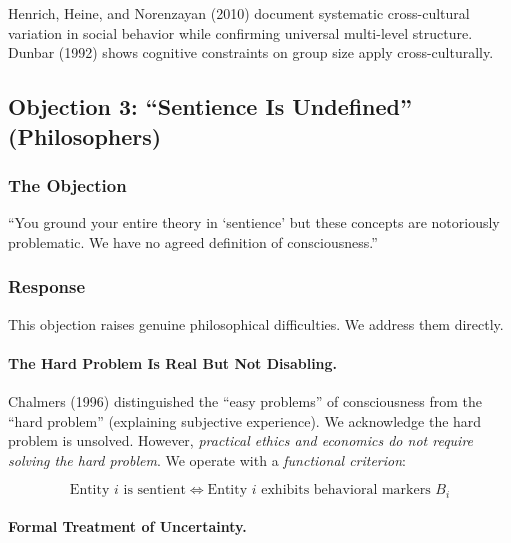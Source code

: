 Henrich, Heine, and Norenzayan (2010) document systematic cross-cultural variation 
in social behavior while confirming universal multi-level structure. Dunbar (1992) 
shows cognitive constraints on group size apply cross-culturally.

\subsection{Objection 3: ``Sentience Is Undefined'' (Philosophers)}

\subsubsection{The Objection}

\begin{tcolorbox}[colback=red!5!white, colframe=red!75!black, title=Philosopher's Objection]
``You ground your entire theory in `sentience' but these concepts are 
notoriously problematic. We have no agreed definition of consciousness.''
\end{tcolorbox}

\subsubsection{Response}

This objection raises genuine philosophical difficulties. We address them directly.

\paragraph{The Hard Problem Is Real But Not Disabling.}

Chalmers (1996) distinguished the ``easy problems'' of consciousness from the 
``hard problem'' (explaining subjective experience). We acknowledge the hard 
problem is unsolved. However, \textit{practical ethics and economics do not 
require solving the hard problem}. We operate with a \textit{functional criterion}:

\begin{equation}
\text{Entity } i \text{ is sentient} \iff \text{Entity } i \text{ exhibits behavioral markers } B_i
\end{equation}

\paragraph{Formal Treatment of Uncertainty.}

